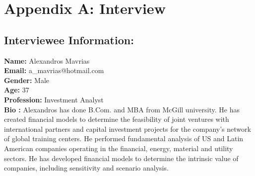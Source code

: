 \documentclass{article}
\begin{document}
\newpage
\section{Appendix A: Interview}
\subsection{Interviewee Information:}
\textbf{Name:} Alexandros Mavrias \\
\textbf{Email:} a\_mavrias@hotmail.com \\
\textbf{Gender:} Male \\
\textbf{Age:} 37 \\
\textbf{Profession:} Investment Analyst \\
\textbf{Bio :} Alexandros has done B.Com. and MBA from McGill university. He has created financial models to determine the feasibility of joint ventures with international partners and capital investment projects for the company’s network of global training centers. He performed fundamental analysis of US and Latin American companies operating in the financial, energy, material and utility sectors. He has developed financial models to determine the intrinsic value of companies, including sensitivity and scenario analysis.
\end{document}
